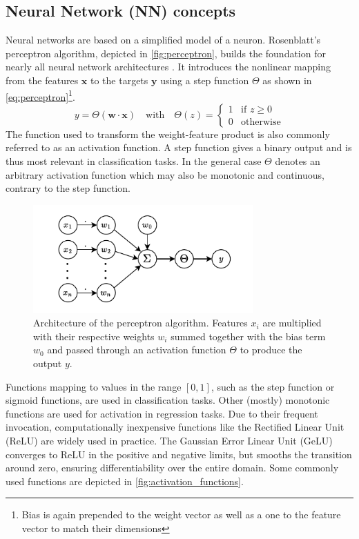 \subsection{Neural Network (NN) concepts}
\label{subsec:nn_concepts}
Neural networks are based on a simplified model of a neuron. Rosenblatt's perceptron algorithm, depicted in \autoref{fig:perceptron}, builds the foundation for nearly all neural network architectures \parencite{ref:rosenblatt1958perceptron}. It introduces the nonlinear mapping from the features $\mathbf{x}$ to the targets $\mathbf{y}$ using a step function $\Theta$ as shown in \autoref{eq:perceptron}\footnote{Bias is again prepended to the weight vector as well as a one to the feature vector to match their dimensions}.
\begin{equation}
    \label{eq:perceptron}
    y = \Theta(\mathbf{w} \cdot \mathbf{x}) \quad \text{with} \quad
    \Theta(z) =
    \begin{cases}
        1 & \text{if } z \geq 0 \\
        0 & \text{otherwise}
    \end{cases}
\end{equation}
The function used to transform the weight-feature product is also commonly referred to as an activation function. A step function gives a binary output and is thus most relevant in classification tasks. In the general case $\Theta$ denotes an arbitrary activation function which may also be monotonic and continuous, contrary to the step function.\\
\begin{figure}[H]
    \centering
    \includegraphics[width=0.75\textwidth]{../fig/background/Perceptron.pdf}
    \caption[Perceptron]{Architecture of the perceptron algorithm. Features $x_i$ are multiplied with their respective weights $w_i$ summed together with the bias term $w_0$ and passed through an activation function $\Theta$ to produce the output $y$.}
    \label{fig:perceptron}
\end{figure}
Functions mapping to values in the range $[0, 1]$, such as the step function or sigmoid functions, are used in classification tasks. Other (mostly) monotonic functions are used for activation in regression tasks. Due to their frequent invocation, computationally inexpensive functions like the Rectified Linear Unit (ReLU) are widely used in practice. The Gaussian Error Linear Unit (GeLU) converges to ReLU in the positive and negative limits, but smooths the transition around zero, ensuring differentiability over the entire domain. Some commonly used functions are depicted in \autoref{fig:activation_functions}. 
